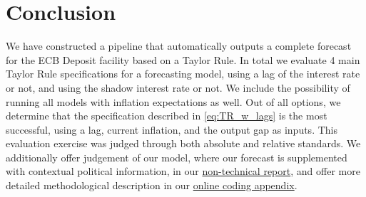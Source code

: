 \section{Conclusion}\label{sec:conc}

We have constructed a pipeline that automatically outputs a complete forecast for the ECB Deposit facility based on a Taylor Rule. In total we evaluate 4 main Taylor Rule specifications for a forecasting model, using a lag of the interest rate or not, and using the shadow interest rate or not. We include the possibility of running all models with inflation expectations as well. Out of all options, we determine that the specification described in \eqref{eq:TR_w_lags} is the most successful, using a lag, current inflation, and the output gap as inputs. This evaluation exercise was judged through both absolute and relative standards. 
We additionally offer judgement of our model, where our forecast is supplemented with contextual political information, in our \href{https://github.com/theshufflebee/therockcast/blob/main/reports/NonTechnicalReport.pdf}{non-technical report}, and offer more detailed methodological description in our \href{https://github.com/theshufflebee/therockcast/blob/main/ECB_Project.pdf}{online coding appendix}.

\clearpage